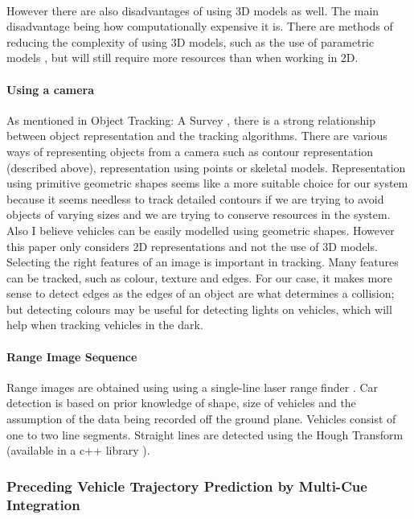 \documentclass[a4paper]{report}
\begin{document}
{\paragraph{}However there are also disadvantages of using 3D models as well. The main disadvantage being how computationally expensive it is. There are methods of reducing the complexity of using 3D models, such as the use of parametric models \citep{kollnig19973d}, but will still require more resources than when working in 2D.

\paragraph{Using a camera}As mentioned in Object Tracking: A Survey \citep{object_tracking_a_survey}, there is a strong relationship between object representation and the tracking algorithms. There are various ways of representing objects from a camera such as contour representation (described above), representation using points or skeletal models. Representation using primitive geometric shapes seems like a more suitable choice for our system because it seems needless to track detailed contours if we are trying to avoid objects of varying sizes and we are trying to conserve resources in the system. Also I believe vehicles can be easily modelled using geometric shapes. However this paper only considers 2D representations and not the use of 3D models. Selecting the right features of an image is important in tracking. Many features can be tracked, such as colour, texture and edges. For our case, it makes more sense to detect edges as the edges of an object are what determines a collision; but detecting colours may be useful for detecting lights on vehicles, which will help when tracking vehicles in the dark. 

\paragraph{Range Image Sequence} Range images are obtained using using a single-line laser range finder \citep{qualitative_car_tracking}. Car detection is based on prior knowledge of shape, size of vehicles and the assumption of the data being recorded off the ground plane. Vehicles consist of one to two line segments. Straight lines are detected using the Hough Transform (available in a c++ library \cite{cpp_houghTransform}).

\subsubsection{Preceding Vehicle Trajectory Prediction by Multi-Cue Integration \citep{multi-cue}}

}
\end{document}

